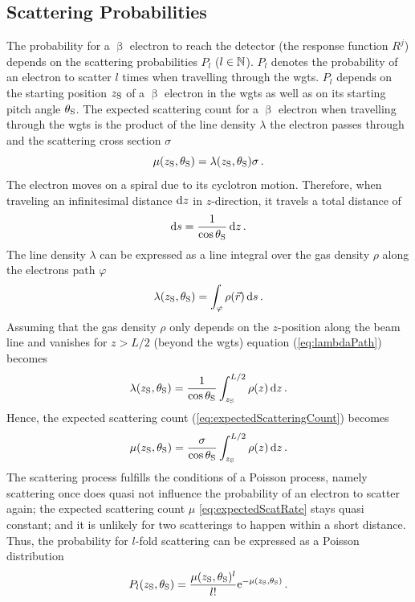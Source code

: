 \subsection{Scattering Probabilities}
\label{sec:scatProbs}
The probability for a $\upbeta$ electron to reach the detector (the response function $R^j$) depends on the scattering probabilities $P_l$ ($l \in \mathbb{N}$). $P_l$ denotes the probability of an electron to scatter $l$ times when travelling through the \gls{wgts}. $P_l$ depends on the starting position $z_\mathrm{S}$ of a $\upbeta$ electron in the \gls{wgts} as well as on its starting pitch angle $\theta_\mathrm{S}$. The expected scattering count for a $\upbeta$ electron when travelling through the \gls{wgts} is the product of the line density $\lambda$ the electron passes through and the scattering cross section $\sigma$
\begin{equation}
    \label{eq:expectedScatteringCount}
    \mu(z_\mathrm{S}, \theta_\mathrm{S}) = \lambda(z_\mathrm{S},\theta_\mathrm{S}) \sigma \text{\,.}
\end{equation}
The electron moves on a spiral due to its cyclotron motion. Therefore, when traveling an infinitesimal distance $\mathop{}\!\mathrm{d} z$ in $z$-direction, it travels a total distance of
\begin{equation}
    \label{eq:infinitesimalElecPath}
    \mathop{}\!\mathrm{d} s = \frac{1}{\cos\theta_\mathrm{S}} \mathop{}\!\mathrm{d} z \text{\,.}
\end{equation}
The line density $\lambda$ can be expressed as a line integral over the gas density $\rho$ along the electrons path $\varphi$
\begin{equation}
    \label{eq:lambdaPath}
    \lambda(z_\mathrm{S},\theta_\mathrm{S}) = \int_{\varphi} \rho(\Vec{r})\mathop{}\!\mathrm{d} s
    \text{\,.}
\end{equation}
Assuming that the gas density $\rho$ only depends on the $z$-position along the beam line and vanishes for $z>L/2$ (beyond the \gls{wgts}) equation (\ref{eq:lambdaPath}) becomes
\begin{equation}
    \label{eq:lambdaPathIntegral}
    \lambda(z_\mathrm{S},\theta_\mathrm{S}) = \frac{1}{\cos\theta_\mathrm{S}}\int_{z_\mathrm{S}}^{L/2} \rho(z)\mathop{}\!\mathrm{d} z \text{\,.}
\end{equation}
Hence, the expected scattering count (\ref{eq:expectedScatteringCount}) becomes
\begin{equation}
    \label{eq:expectedScatRate}
    \mu(z_\mathrm{S}, \theta_\mathrm{S}) = \frac{\sigma}{\cos\theta_\mathrm{S}}\int_{z_\mathrm{S}}^{L/2} \rho(z)\mathop{}\!\mathrm{d} z \text{\,.}
\end{equation}
The scattering process fulfills the conditions of a Poisson process, namely scattering once does quasi not influence the probability of an electron to scatter again; the expected scattering count $\mu$ \eqref{eq:expectedScatRate} stays quasi constant; and it is unlikely for two scatterings to happen within a short distance. Thus, the probability for $l$-fold scattering can be expressed as a Poisson distribution
\begin{equation}
    \label{eq:scatProbs}
    P_l(z_\mathrm{S}, \theta_\mathrm{S}) = 
    \frac{
        \mu(z_\mathrm{S}, \theta_\mathrm{S})^l
    }{l!}
    \mathrm{e}^{-\mu(z_\mathrm{S}, \theta_\mathrm{S})} \text{\,.}
\end{equation}
